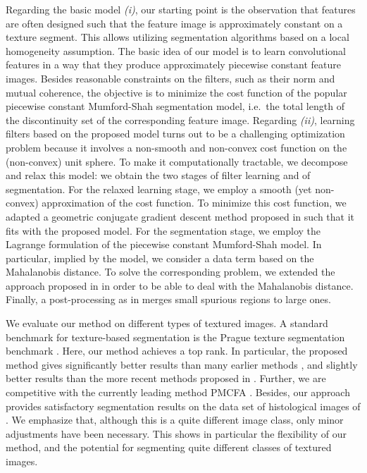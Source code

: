 \documentclass[journal]{IEEEtran}
\begin{document}
Regarding the basic model \emph{(i)}, 
our starting point is the observation 
that features are often designed such that 
the feature image is approximately constant on a texture segment.
This allows utilizing segmentation algorithms based on a local homogeneity assumption.
The basic idea of our model is to learn 
convolutional features
in a way that they produce approximately piecewise constant feature images. 
Besides reasonable constraints on the filters, such as their norm and mutual coherence,
the objective is to minimize 
the cost function of the popular piecewise constant Mumford-Shah segmentation model, i.e.~the total length of the discontinuity set of the corresponding feature image.
Regarding \emph{(ii)}, 
learning filters based on the proposed model turns out to be a
challenging optimization problem
because it involves a non-smooth and non-convex cost function 
on the (non-convex) unit sphere.
To make it computationally tractable,
we decompose and relax this model:
we obtain the two stages of  filter learning and of segmentation.
For the relaxed learning stage, we employ
a smooth (yet non-convex) approximation of the cost function.
To minimize this cost function, we adapted  
a geometric conjugate gradient descent method proposed in \cite{hawe2013,kiechle2015}
such that it fits with the proposed model.
For the segmentation stage,
we employ the Lagrange formulation of the piecewise constant Mumford-Shah model. 
In particular, implied by the model, we consider a data term based on the Mahalanobis distance.
To solve the corresponding problem,
we extended the approach proposed in \cite{storath2014jump,storath2014fast} in order to be able to deal with the Mahalanobis distance.
Finally, a post-processing as in \cite{yuan2015factorization} merges small spurious regions to large ones.

We evaluate our method on different types of textured images.
A standard benchmark for texture-based segmentation
is the Prague texture segmentation benchmark \cite{haindl2008online}.
Here, our method achieves a top rank.
In particular, the proposed method gives significantly better results than many earlier methods
\cite{todorovic2009, galun2003, haindl2004, haindl2006,scarpa2009, yuan2012image},
and slightly better results than the more recent methods proposed in
\cite{yuan2015factorization,mevenkamp2016}.
 Further, we are competitive with the currently leading method PMCFA \cite{panagiotakis2011,panagiotakis2011slides}.
Besides, our approach 
provides satisfactory segmentation results
on the data set of histological images of \cite{mccann2014}. 
We emphasize that, although this is a quite different image class, only minor adjustments have been necessary.
This shows in particular the flexibility of our method, 
and the potential for segmenting quite different classes of textured images.
\end{document}
